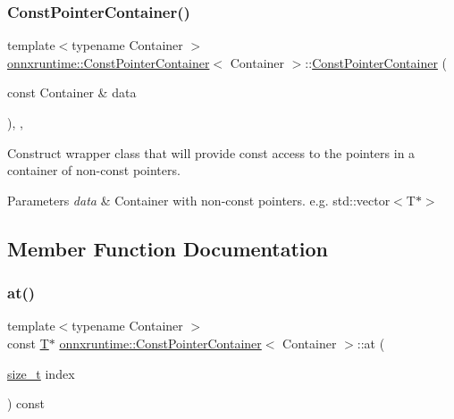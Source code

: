 \subsubsection{\texorpdfstring{Const\+Pointer\+Container()}{ConstPointerContainer()}}
{\footnotesize\ttfamily template$<$typename Container $>$ \\
\mbox{\hyperlink{classonnxruntime_1_1ConstPointerContainer}{onnxruntime\+::\+Const\+Pointer\+Container}}$<$ Container $>$\+::\mbox{\hyperlink{classonnxruntime_1_1ConstPointerContainer}{Const\+Pointer\+Container}} (\begin{DoxyParamCaption}\item[{const Container \&}]{data }\end{DoxyParamCaption})\hspace{0.3cm}{\ttfamily [inline]}, {\ttfamily [explicit]}, {\ttfamily [noexcept]}}

Construct wrapper class that will provide const access to the pointers in a container of non-\/const pointers. 
\begin{DoxyParams}{Parameters}
{\em data} & Container with non-\/const pointers. e.\+g. std\+::vector$<$\+T$\ast$$>$ \\
\hline
\end{DoxyParams}


\subsection{Member Function Documentation}
\mbox{\label{classonnxruntime_1_1ConstPointerContainer_a8e9d402cb3a0b535da9a5864527d8bd9}} 
\subsubsection{\texorpdfstring{at()}{at()}}
{\footnotesize\ttfamily template$<$typename Container $>$ \\
const \mbox{\hyperlink{classonnxruntime_1_1ConstPointerContainer_ae78936c3220735b7dba8004b7d5c9888}{T}}$\ast$ \mbox{\hyperlink{classonnxruntime_1_1ConstPointerContainer}{onnxruntime\+::\+Const\+Pointer\+Container}}$<$ Container $>$\+::at (\begin{DoxyParamCaption}\item[{\mbox{\hyperlink{mlasi_8h_a503efbc1c6e50825320ad909366b78ab}{size\+\_\+t}}}]{index }\end{DoxyParamCaption}) const\hspace{0.3cm}{\ttfamily [inline]}}

